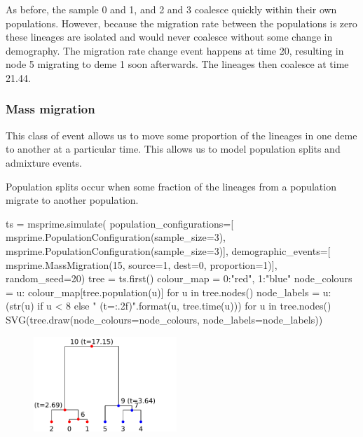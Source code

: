 \documentclass[graybox]{svmult}
\newcommand{\includenbimage}[1]{\begin{center}\texttt{[image: \#1]}\end{center}}
\begin{document}
    As before, the sample 0 and 1, and 2 and 3 coalesce quickly within their
own populations. However, because the migration rate between the
populations is zero these lineages are isolated and would never coalesce
without some change in demography. The migration rate change event
happens at time 20, resulting in node 5 migrating to deme 1 soon
afterwards. The lineages then coalesce at time 21.44.

\subsubsection{Mass migration}\label{mass-migration}

This class of event allows us to move some proportion of the lineages in
one deme to another at a particular time. This allows us to model
population splits and admixture events.

Population splits occur when some fraction of the lineages from a
population migrate to another population.

\begin{pythoncode}
ts  = msprime.simulate(
    population_configurations=[
        msprime.PopulationConfiguration(sample_size=3),
        msprime.PopulationConfiguration(sample_size=3)],
    demographic_events=[
        msprime.MassMigration(15, source=1, dest=0, proportion=1)],
    random_seed=20)
tree = ts.first()
colour_map = {0:"red", 1:"blue"}
node_colours = {u: colour_map[tree.population(u)] for u in tree.nodes()}
node_labels = {
    u: (str(u) if u < 8 else "{} (t={:.2f})".format(u, tree.time(u)))
    for u in tree.nodes()}
SVG(tree.draw(node_colours=node_colours, node_labels=node_labels))
\end{pythoncode}


\begin{figure}
  \begin{center}
    \includegraphics[width=0.48\textwidth]{images/simulations_37_0.pdf}
  \end{center}
\end{figure}
\end{document}
